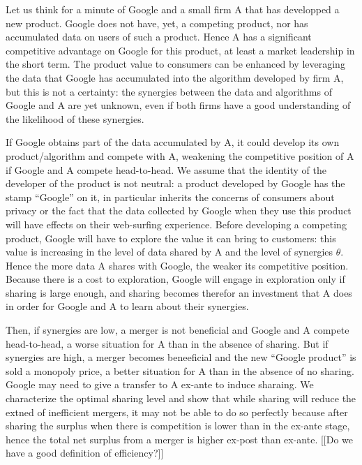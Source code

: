 \documentclass[a4paper,leqno]{article}%
\renewcommand{\t}{\theta}
\begin{document}
Let us think for a minute of Google and a small firm A that has developped a new product. Google does not have, yet, a competing product, nor has accumulated data on users of such a product. Hence A has a significant competitive advantage on Google for this product, at least a market leadership in the short term. The product value to consumers can be enhanced by leveraging the data that Google has accumulated into the algorithm developed by firm A, but this is not a certainty: the synergies between the data and algorithms of Google and A are yet unknown, even if both firms have a good understanding of the likelihood of these synergies. 

If Google obtains part of the data accumulated by A, it could develop its own product/algorithm and compete with A, weakening the competitive position of A if Google and A compete head-to-head. We assume that the identity of the developer of the product is not neutral: a product developed by Google has the stamp ``Google'' on it, in particular inherits the concerns of consumers about privacy or the fact that the data collected by Google when they use this product will have effects on their web-surfing experience. Before developing a competing product, Google will have to explore the value it can bring to customers: this value is increasing in the level of data shared by A and the level of synergies $\t$. Hence the more data A shares with Google, the weaker its competitive position. Because there is a cost to exploration, Google will engage in exploration only if sharing is large enough, and sharing becomes therefor an investment that A does in order for Google and A to learn about their synergies.

Then, if synergies are low, a merger is not beneficial and Google and A compete head-to-head, a worse situation for A than in the absence of sharing. But if synergies are high, a merger becomes beneeficial and the new ``Google product'' is sold a monopoly price, a better situation for A than in the absence of no sharing. Google may need to give a transfer to A ex-ante to induce sharaing. We characterize the optimal sharing level and show that while sharing will reduce the extned of inefficient mergers, it may not be able to do so perfectly because after sharing the surplus when there is competition is lower than in the ex-ante stage, hence the total net surplus from a merger is higher ex-post than ex-ante. [[Do we have a good definition of efficiency?]]
\end{document}
